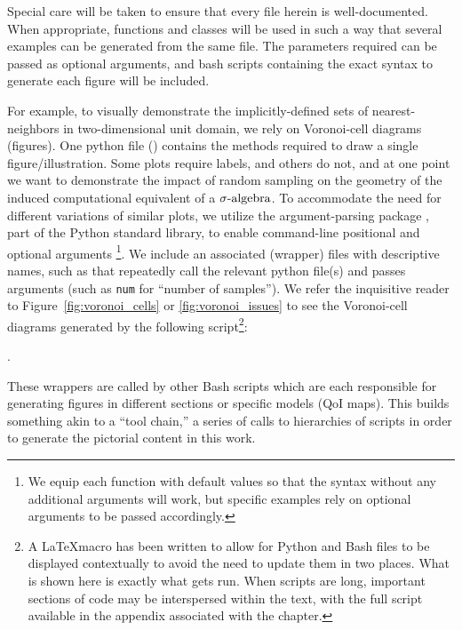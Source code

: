 Special care will be taken to ensure that every file herein is well-documented.
When appropriate, functions and classes will be used in such a way that several examples can be generated from the same file.
The parameters required can be passed as optional arguments, and bash scripts containing the exact syntax to generate each figure will be included.

For example, to visually demonstrate the implicitly-defined sets of nearest-neighbors in two-dimensional unit domain, we rely on Voronoi-cell diagrams (figures).
One python file () contains the methods required to draw a single figure/illustration.
Some plots require labels, and others do not, and at one point we want to demonstrate the impact of random sampling on the geometry of the induced computational equivalent of a $\sigma\text{-algebra}$.
To accommodate the need for different variations of similar plots, we utilize the argument-parsing package , part of the Python standard library, to enable command-line positional and optional arguments \footnote{We equip each function with default values so that the syntax  without any additional arguments will work, but specific examples rely on optional arguments to be passed accordingly.}.
We include an associated (wrapper) files with descriptive names, such as  that repeatedly call the relevant python file(s) and passes arguments (such as {\tt num} for ``number of samples'').
We refer the inquisitive reader to  Figure~\ref{fig:voronoi_cells} or \ref{fig:voronoi_issues} to see the Voronoi-cell diagrams generated by the following script\footnote{A \LaTeX macro has been written to allow for Python and Bash files to be displayed contextually to avoid the need to update them in two places. What is shown here is exactly what gets run. When scripts are long, important sections of code may be interspersed within the text, with the full script available in the appendix associated with the chapter.}:

.

These wrappers are called by other Bash scripts which are each responsible for generating figures in different sections or specific models (QoI maps).
This builds something akin to a ``tool chain,'' a series of calls to hierarchies of scripts in order to generate the pictorial content in this work.

